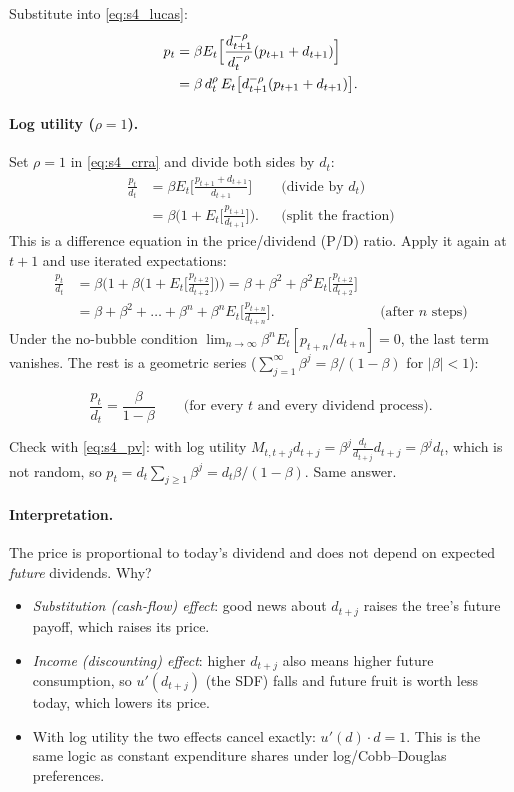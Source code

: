 Substitute into \eqref{eq:s4_lucas}:
\begin{align}
  p_t &= \beta E_t\Big[\frac{d_{t+1}^{-\rho}}{d_t^{-\rho}}(p_{t+1}+d_{t+1})\Big]\notag\\
      &= \beta\, d_t^{\rho}\,E_t\big[d_{t+1}^{-\rho}(p_{t+1}+d_{t+1})\big]. \label{eq:s4_crra}
\end{align}

\paragraph{Log utility ($\rho=1$).}
Set $\rho=1$ in \eqref{eq:s4_crra} and divide both sides by $d_t$:
\begin{align*}
  \frac{p_t}{d_t} &= \beta E_t\Big[\frac{p_{t+1}+d_{t+1}}{d_{t+1}}\Big] && \text{(divide by $d_t$)}\\
  &= \beta\Big(1 + E_t\Big[\frac{p_{t+1}}{d_{t+1}}\Big]\Big). && \text{(split the fraction)}
\end{align*}
This is a difference equation in the price/dividend (P/D) ratio. Apply it again at $t+1$ and use iterated expectations:
\begin{align*}
  \frac{p_t}{d_t} &= \beta\Big(1 + \beta\Big(1 + E_t\Big[\frac{p_{t+2}}{d_{t+2}}\Big]\Big)\Big)
  = \beta + \beta^2 + \beta^2E_t\Big[\frac{p_{t+2}}{d_{t+2}}\Big]\\
  &= \beta + \beta^2 + \dots + \beta^n + \beta^n E_t\Big[\frac{p_{t+n}}{d_{t+n}}\Big]. && \text{(after $n$ steps)}
\end{align*}
Under the no-bubble condition $\lim_{n\to\infty}\beta^nE_t[p_{t+n}/d_{t+n}]=0$, the last term vanishes. The rest is a geometric series ($\sum_{j=1}^\infty \beta^j = \beta/(1-\beta)$ for $|\beta|<1$):
\begin{keybox}[title=Log utility: constant P/D ratio]
\[
  \frac{p_t}{d_t} = \frac{\beta}{1-\beta}\qquad\text{(for every $t$ and every dividend process).}
\]
\end{keybox}
Check with \eqref{eq:s4_pv}: with log utility $M_{t,t+j}d_{t+j} = \beta^j\frac{d_t}{d_{t+j}}d_{t+j}=\beta^jd_t$, which is not random, so $p_t=d_t\sum_{j\ge1}\beta^j = d_t\beta/(1-\beta)$. Same answer.

\paragraph{Interpretation.} The price is proportional to today's dividend and does not depend on expected \emph{future} dividends. Why?
\begin{itemize}
  \item \emph{Substitution (cash-flow) effect}: good news about $d_{t+j}$ raises the tree's future payoff, which raises its price.
  \item \emph{Income (discounting) effect}: higher $d_{t+j}$ also means higher future consumption, so $u'(d_{t+j})$ (the SDF) falls and future fruit is worth less today, which lowers its price.
  \item With log utility the two effects cancel exactly: $u'(d)\cdot d = 1$. This is the same logic as constant expenditure shares under log/Cobb--Douglas preferences.
\end{itemize}

